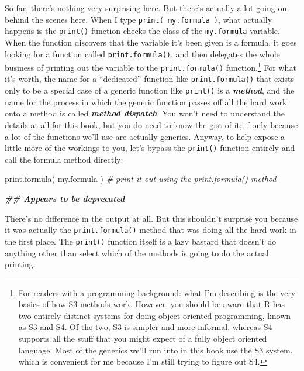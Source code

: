 \documentclass[
]{book}
\newenvironment{Shaded}{\begin{snugshade}}{\end{snugshade}}
\newcommand{\CommentTok}[1]{\textcolor[rgb]{0.56,0.35,0.01}{\textit{#1}}}
\newcommand{\DocumentationTok}[1]{\textcolor[rgb]{0.56,0.35,0.01}{\textbf{\textit{#1}}}}
\newcommand{\FunctionTok}[1]{\textcolor[rgb]{0.00,0.00,0.00}{#1}}
\newcommand{\NormalTok}[1]{#1}
\begin{document}
So far, there's nothing very surprising here. But there's actually a lot going on behind the scenes here. When I type \texttt{print(\ my.formula\ )}, what actually happens is the \texttt{print()} function checks the class of the \texttt{my.formula} variable. When the function discovers that the variable it's been given is a formula, it goes looking for a function called \texttt{print.formula()}, and then delegates the whole business of printing out the variable to the \texttt{print.formula()} function.\footnote{For readers with a programming background: what I'm describing is the very basics of how S3 methods work. However, you should be aware that R has two entirely distinct systems for doing object oriented programming, known as S3 and S4. Of the two, S3 is simpler and more informal, whereas S4 supports all the stuff that you might expect of a fully object oriented language. Most of the generics we'll run into in this book use the S3 system, which is convenient for me because I'm still trying to figure out S4.} For what it's worth, the name for a ``dedicated'' function like \texttt{print.formula()} that exists only to be a special case of a generic function like \texttt{print()} is a \textbf{\emph{method}}, and the name for the process in which the generic function passes off all the hard work onto a method is called \textbf{\emph{method dispatch}}. You won't need to understand the details at all for this book, but you do need to know the gist of it; if only because a lot of the functions we'll use are actually generics. Anyway, to help expose a little more of the workings to you, let's bypass the \texttt{print()} function entirely and call the formula method directly:

\begin{Shaded}
\begin{Highlighting}[]
\FunctionTok{print.formula}\NormalTok{( my.formula )       }\CommentTok{\# print it out using the print.formula() method}

\DocumentationTok{\#\# Appears to be deprecated}
\end{Highlighting}
\end{Shaded}

There's no difference in the output at all. But this shouldn't surprise you because it was actually the \texttt{print.formula()} method that was doing all the hard work in the first place. The \texttt{print()} function itself is a lazy bastard that doesn't do anything other than select which of the methods is going to do the actual printing.
\end{document}

